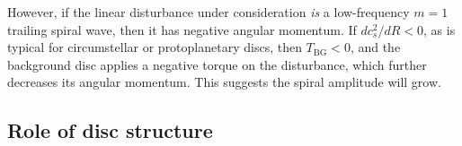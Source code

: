 However, if the linear disturbance under consideration \emph{is} a
low-frequency $m=1$ 
trailing spiral wave, then it has negative angular
momentum. If $dc_s^2/dR<0$, as is typical for circumstellar or
protoplanetary discs, then $T_\mathrm{BG}<0$, and the background disc
applies a negative torque on the disturbance, which further decreases
its angular momentum. This suggests the spiral amplitude will grow.  



\subsection{Role of disc structure}
